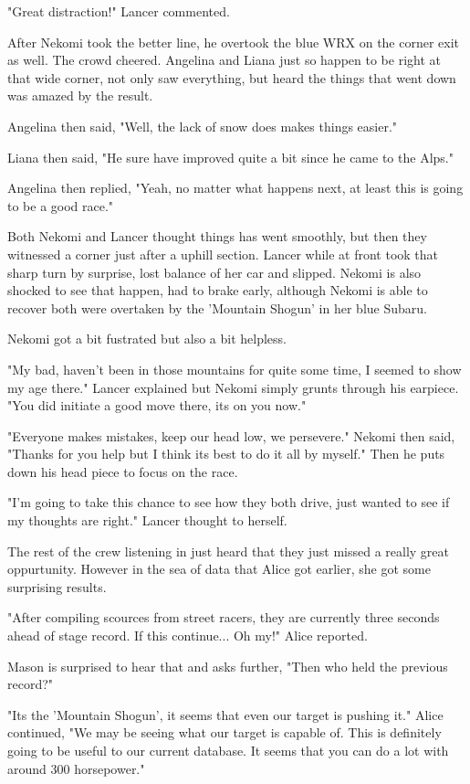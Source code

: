 "Great distraction!" Lancer commented.

After Nekomi took the better line, he overtook the blue WRX on the corner exit as well. The crowd cheered. Angelina and Liana just so happen to be right at that wide corner, not only saw everything, but heard the things that went down was amazed by the result.

Angelina then said, "Well, the lack of snow does makes things easier."

Liana then said, "He sure have improved quite a bit since he came to the Alps."

Angelina then replied, "Yeah, no matter what happens next, at least this is going to be a good race."

Both Nekomi and Lancer thought things has went smoothly, but then they witnessed a corner just after a uphill section. Lancer while at front took that sharp turn by surprise, lost balance of her car and slipped. Nekomi is also shocked to see that happen, had to brake early, although Nekomi is able to recover both were overtaken by the 'Mountain Shogun' in her blue Subaru.

Nekomi got a bit fustrated but also a bit helpless.

"My bad, haven't been in those mountains for quite some time, I seemed to show my age there." Lancer explained but Nekomi simply grunts through his earpiece. "You did initiate a good move there, its on you now."

"Everyone makes mistakes, keep our head low, we persevere." Nekomi then said, "Thanks for you help but I think its best to do it all by myself." Then he puts down his head piece to focus on the race.

"I'm going to take this chance to see how they both drive, just wanted to see if my thoughts are right." Lancer thought to herself.

The rest of the crew listening in just heard that they just missed a really great oppurtunity. However in the sea of data that Alice got earlier, she got some surprising results.

"After compiling scources from street racers, they are currently three seconds ahead of stage record. If this continue... Oh my!" Alice reported.

Mason is surprised to hear that and asks further, "Then who held the previous record?"

"Its the 'Mountain Shogun', it seems that even our target is pushing it." Alice continued, "We may be seeing what our target is capable of. This is definitely going to be useful to our current database. It seems that you can do a lot with around 300 horsepower."

